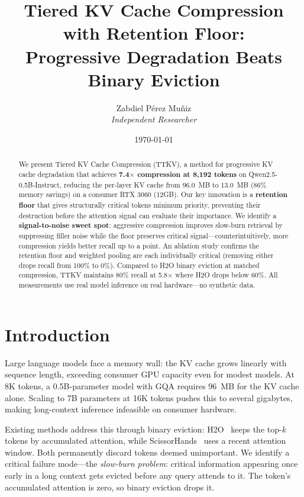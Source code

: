 \documentclass[11pt]{article}
\title{Tiered KV Cache Compression with Retention Floor: \\Progressive Degradation Beats Binary Eviction}
\author{Zabdiel P\'erez Mu\~niz \\\textit{Independent Researcher}}
\date{\today}
\begin{document}
\maketitle

\begin{abstract}
We present Tiered KV Cache Compression (TTKV), a method for progressive KV cache degradation that achieves \textbf{7.4$\times$ compression at 8,192 tokens} on Qwen2.5-0.5B-Instruct, reducing the per-layer KV cache from 96.0~MB to 13.0~MB (86\% memory savings) on a consumer RTX 3060 (12GB). Our key innovation is a \textbf{retention floor} that gives structurally critical tokens minimum priority, preventing their destruction before the attention signal can evaluate their importance. We identify a \textbf{signal-to-noise sweet spot}: aggressive compression improves slow-burn retrieval by suppressing filler noise while the floor preserves critical signal---counterintuitively, more compression yields better recall up to a point. An ablation study confirms the retention floor and weighted pooling are each individually critical (removing either drops recall from 100\% to 0\%). Compared to H2O binary eviction at matched compression, TTKV maintains 80\% recall at 5.8$\times$ where H2O drops below 60\%. All measurements use real model inference on real hardware---no synthetic data.
\end{abstract}

\section{Introduction}

Large language models face a memory wall: the KV cache grows linearly with sequence length, exceeding consumer GPU capacity even for modest models. At 8K tokens, a 0.5B-parameter model with GQA requires 96~MB for the KV cache alone. Scaling to 7B parameters at 16K tokens pushes this to several gigabytes, making long-context inference infeasible on consumer hardware.

Existing methods address this through binary eviction: H2O~\cite{h2o} keeps the top-$k$ tokens by accumulated attention, while ScissorHands~\cite{scissorhands} uses a recent attention window. Both permanently discard tokens deemed unimportant. We identify a critical failure mode---the \textit{slow-burn problem}: critical information appearing once early in a long context gets evicted before any query attends to it. The token's accumulated attention is zero, so binary eviction drops it.
\end{document}
